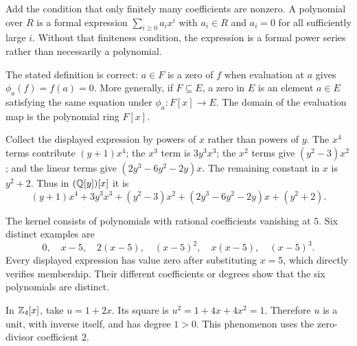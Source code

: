 Add the condition that only finitely many coefficients are nonzero. A polynomial over $R$ is a formal expression $\sum_{i\ge0}a_ix^i$ with $a_i\in R$ and $a_i=0$ for all sufficiently large $i$. Without that finiteness condition, the expression is a formal power series rather than necessarily a polynomial.

The stated definition is correct: $a\in F$ is a zero of $f$ when evaluation at $a$ gives $\phi_a(f)=f(a)=0$. More generally, if $F\subseteq E$, a zero in $E$ is an element $a\in E$ satisfying the same equation under $\phi_a:F[x]\to E$. The domain of the evaluation map is the polynomial ring $F[x]$.

Collect the displayed expression by powers of $x$ rather than powers of $y$. The $x^4$ terms contribute $(y+1)x^4$; the $x^3$ term is $3y^3x^3$; the $x^2$ terms give $(y^2-3)x^2$; and the linear terms give $(2y^3-6y^2-2y)x$. The remaining constant in $x$ is $y^2+2$. Thus in $(\mathbb{Q}[y])[x]$ it is
\[\boxed{(y+1)x^4+3y^3x^3+(y^2-3)x^2+(2y^3-6y^2-2y)x+(y^2+2)}.
\]

The kernel consists of polynomials with rational coefficients vanishing at $5$. Six distinct examples are
\[0,\quad x-5,\quad 2(x-5),\quad (x-5)^2,\quad x(x-5),\quad (x-5)^3.
\]
Every displayed expression has value zero after substituting $x=5$, which directly verifies membership. Their different coefficients or degrees show that the six polynomials are distinct.

In $\mathbb{Z}_4[x]$, take $u=1+2x$. Its square is $u^2=1+4x+4x^2=1$. Therefore $u$ is a unit, with inverse itself, and has degree $1>0$. This phenomenon uses the zero-divisor coefficient $2$.

